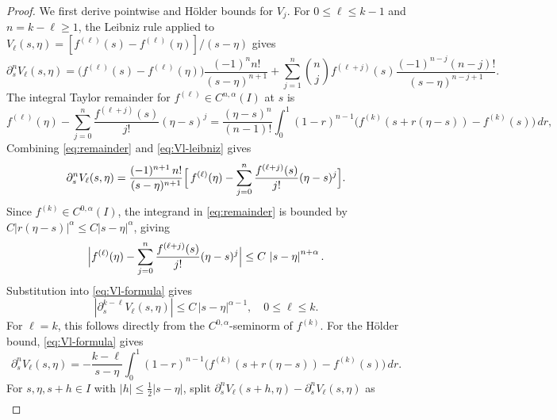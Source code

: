 \documentclass[11pt,reqno]{amsart}
\theoremstyle{plain}
\theoremstyle{definition}
\numberwithin{equation}{section}
\newcommand{\p}{\partial}
\newcommand{\abs}[1]{\left\lvert #1 \right\rvert}
\newcommand{\ci}[1]{C^{#1}(I)}
\begin{document}
\begin{proof}
We first derive pointwise and H\"older bounds for $V_j$.
For $0\le \ell\le k-1$ and $n=k-\ell\ge 1$, the Leibniz rule applied to
$V_\ell(s,\eta)=[f^{(\ell)}(s)-f^{(\ell)}(\eta)]/(s-\eta)$ gives
\begin{equation}\label{eq:Vl-leibniz}
    \p_s^n V_\ell(s,\eta)
    = \bigl(f^{(\ell)}(s)-f^{(\ell)}(\eta)\bigr)
      \frac{(-1)^n n!}{(s-\eta)^{n+1}}
      +\sum_{j=1}^{n}\binom{n}{j}f^{(\ell+j)}(s)
      \frac{(-1)^{n-j}(n-j)!}{(s-\eta)^{n-j+1}}.
\end{equation}
The integral Taylor remainder for $f^{(\ell)}\in\ci{n,\alpha}$ at $s$ is
\begin{equation}\label{eq:remainder}
    f^{(\ell)}(\eta)-\sum_{j=0}^{n}\frac{f^{(\ell+j)}(s)}{j!}(\eta-s)^j
    = \frac{(\eta-s)^n}{(n-1)!}
      \int_0^1(1-r)^{n-1}\bigl(f^{(k)}(s+r(\eta-s))-f^{(k)}(s)\bigr)\,dr,
\end{equation}
Combining \eqref{eq:remainder} and \eqref{eq:Vl-leibniz} gives
\begin{equation}\label{eq:Vl-formula}
    \p_s^n V_\ell(s,\eta)
    = \frac{(-1)^{n+1}\,n!}{(s-\eta)^{n+1}}
      \Bigl[\,f^{(\ell)}(\eta)
      -\sum_{j=0}^{n}\frac{f^{(\ell+j)}(s)}{j!}(\eta-s)^j\Bigr].
\end{equation}
Since $f^{(k)}\in\ci{0,\alpha}$, the integrand in \eqref{eq:remainder} is bounded by
$C\abs{r(\eta-s)}^\alpha\le C\abs{s-\eta}^\alpha$, giving
\begin{equation}\label{eq:remainder-bound}
    \Bigl\lvert f^{(\ell)}(\eta)-\sum_{j=0}^{n}\frac{f^{(\ell+j)}(s)}{j!}(\eta-s)^j
    \Bigr\rvert \le C\,\abs{s-\eta}^{n+\alpha}.
\end{equation}
Substitution into \eqref{eq:Vl-formula} gives
\begin{equation}\label{eq:Vl-ptwise}
    \abs{\p_s^{k-\ell}V_\ell(s,\eta)} \le C\,\abs{s-\eta}^{\alpha-1},
    \quad 0\le \ell\le k.
\end{equation}
For $\ell=k$, this follows directly from the
$C^{0,\alpha}$-seminorm of $f^{(k)}$.
For the H\"older bound, \eqref{eq:Vl-formula} gives
\begin{equation}\label{eq:Vl-intrep}
    \p_s^n V_\ell(s,\eta)
    = -\frac{k-\ell}{s-\eta}
      \int_0^1(1-r)^{n-1}
      \bigl(f^{(k)}(s+r(\eta-s))-f^{(k)}(s)\bigr)\,dr.
\end{equation}
For $s,\eta,s+h\in I$ with
$\abs{h}\le\tfrac{1}{2}\abs{s-\eta}$, split
$\p_s^n V_\ell(s+h,\eta)-\p_s^n V_\ell(s,\eta)$ as
\begin{align}

\end{align}
\end{proof}
\end{document}

